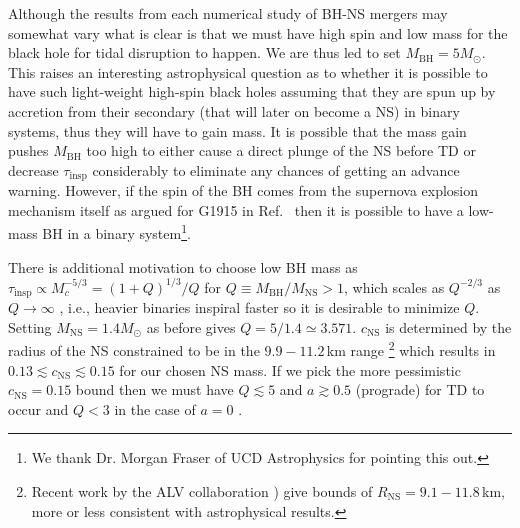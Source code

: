\documentclass[prd,amsmath,amssymb,aps,floats,amsfonts,notitlepage,superscriptaddress,eqsecnum,nofootinbib,10pt]{revtex4-1}
\begin{document}
Although the results from each numerical study of BH-NS mergers may somewhat vary what is clear is that we must have high spin and low mass for the black hole for tidal disruption to happen. 
We are thus led to set $M_\text{BH} =5 M_\odot$. 
This raises an interesting astrophysical question as to whether it is possible to have such light-weight high-spin black holes assuming that
they are spun up by accretion from their secondary (that will later on become a NS) in binary systems, thus they will have to gain mass.
It is possible that the mass gain pushes $M_\text{BH}$ too high to either cause a direct plunge of the NS before TD or decrease $\tau_\text{insp}$ considerably
to eliminate any chances of getting an advance warning.
However, if the spin of the BH comes from the supernova explosion mechanism itself as argued for G1915 in Ref.~\cite{McClintock:2006xd} then it is possible to have a 
low-mass BH in a binary system\footnote{We thank Dr. Morgan Fraser of UCD Astrophysics
for pointing this out.}.

There is additional motivation to choose low BH mass as 
 $\tau_\text{insp} \propto M_c^{-5/3} = (1+Q)^{1/3}/Q$ for $Q\equiv M_\text{BH}/M_\text{NS} > 1$, which scales as $Q^{-2/3}$ as $Q\to\infty$ , i.e., heavier binaries inspiral faster
 so it is desirable to minimize $Q$.
 Setting $M_\text{NS}=1.4 M_\odot$ as before gives $Q=5/1.4  \simeq 3.571$. $c_\text{NS}$ is determined by the radius of the NS constrained to be in the $9.9 - 11.2\,$km range \footnote{Recent work by the ALV collaboration \cite{GW170817_radii}) give bounds of $R_\text{NS}=9.1 -11.8\,$km, more or less consistent with astrophysical results.}\cite{Ozel:2016oaf}
 which results in $0.13\lesssim c_\text{NS} \lesssim 0.15$ 
 for our chosen NS mass. 
If we pick the more pessimistic $c_\text{NS} = 0.15$ bound then we must have $Q\lesssim 5$ and $a\gtrsim 0.5$ (prograde) for TD to occur \cite{Ferrari:2008nr}
and $Q< 3$ in the case of $a=0$ \cite{Kyutoku:2011vz}.
\end{document}
